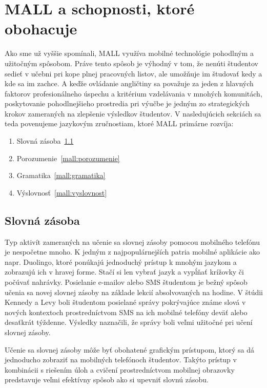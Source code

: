 \documentclass[10pt,oneside,slovak,a4paper]{article}
\begin{document}
\section{MALL a schopnosti, ktoré obohacuje} \label{mall}

Ako sme už vyššie spomínali, MALL využíva mobilné technológie pohodlným a užitočným spôsobom. Práve tento spôsob je výhodný v tom, že nenúti študentov sedieť v učebni pri kope plnej pracovných listov, ale umožňuje im študovať kedy a kde sa im zachce. A keďže ovládanie angličtiny sa považuje za jeden z hlavných faktorov profesionálneho úspechu a kritérium vzdelávania v mnohých komunitách, poskytovanie pohodlnejšieho prostredia pri výučbe je jedným zo strategických krokov zameraných na zlepšenie výsledkov študentov\cite{Miangah2012}. V nasledujúcich sekciách sa teda povenujeme jazykovým zručnostiam, ktoré MALL primárne rozvíja:

\begin{enumerate}
\item Slovná zásoba~\ref{mall:slovnazasoba}
\item Porozumenie~\ref{mall:porozumenie}
\item Gramatika~\ref{mall:gramatika}
\item Výslovnosť~\ref{mall:vyslovnost}
\end{enumerate}


\subsection{Slovná zásoba} \label{mall:slovnazasoba}

Typ aktivít zameraných na učenie sa slovnej zásoby pomocou mobilného telefónu je nespočetne mnoho. K jedným z najpopulárnejších patria mobilné aplikácie ako napr. Duolingo, ktoré ponúkajú jednoduchý prístup k mnohým jazykom a zobrazujú ich v hravej forme. Stačí si len vybrať jazyk a vypĺňať krížovky či počúvať nahrávky. Posielanie e-mailov alebo SMS študentom je bežný spôsob učenia sa novej slovnej zásoby na základe lekcií absolvovaných na hodine. V štúdii Kennedy a Levy boli študentom posielané správy pokrývajúce známe slová v nových kontextoch prostredníctvom SMS na ich mobilné telefóny deväť alebo desaťkrát týždenne. Výsledky naznačili, že správy boli veľmi užitočné pri učení slovnej zásoby\cite{Kennedy2008}. 

Učenie sa slovnej zásoby môže byť obohatené grafickým prístupom, ktorý sa dá jednoducho zobraziť na mobilných telefónoch študentov. Takýto prístup v kombinácii s riešením úloh a cvičení prostredníctvom mobilnej obrazovky predstavuje veľmi efektívny spôsob ako si upevniť slovnú zásobu.
\end{document}
